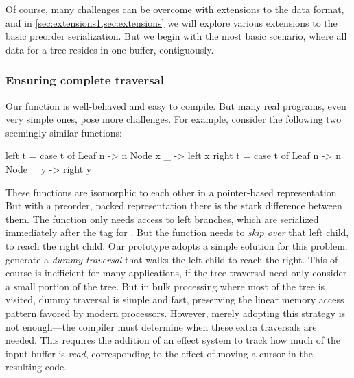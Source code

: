 \documentclass[a4paper,english]{lipics-v2016}
\newif\ifcurly
\begin{document}
Of course, many challenges can be overcome with extensions to the data
{format, and in \cref{sec:extensions1,sec:extensions} we will explore various
extensions to the basic preorder serialization}.  But we begin with the
most basic scenario, where all data for a tree resides in one buffer,
contiguously.


\subsubsection{Ensuring complete traversal} Our  function is
well-behaved and easy to compile. But many real programs, even very
simple ones, pose more challenges. For example, consider the following
two seemingly-similar functions:

\ifcurly
\begin{code}[language=c]
  fun left(t) {
    match(t) {
      Leaf(n):   return n;
      Node(x,_): return left(x);
  }}
  fun right(t) {
    match(t) {
      Leaf(n):   return n;
      Node(_,y): return right(y);
  }}
\end{code}
\else
\begin{code}
  left t = case t of
             Leaf n   -> n
             Node x _ -> left x
  right t = case t of
              Leaf n   -> n
              Node _ y -> right y
\end{code}
\fi

These functions are isomorphic to each other in a pointer-based
representation.  But with a preorder, packed representation there is
the stark difference between them.  The  function only needs
access to left branches, which are serialized immediately after the
tag for .  But the  function needs to {\em skip
  over} that left child, to reach the right child.  Our prototype
adopts a simple
solution for this problem: generate a {\em dummy traversal} that
walks the left child to reach the right.
%
This of course is inefficient for many applications, if the tree
traversal need only consider a small portion of the tree. But in bulk
processing where most of the tree is visited, dummy traversal is
simple and fast, preserving the linear memory access pattern favored
by modern processors. 
%
However, merely adopting this strategy is not enough---the compiler
must determine when these extra traversals are needed. This requires
the addition of an effect system to track how much of the input buffer
is \emph{read}, corresponding to the effect of moving a cursor in the
resulting code.

\end{document}
